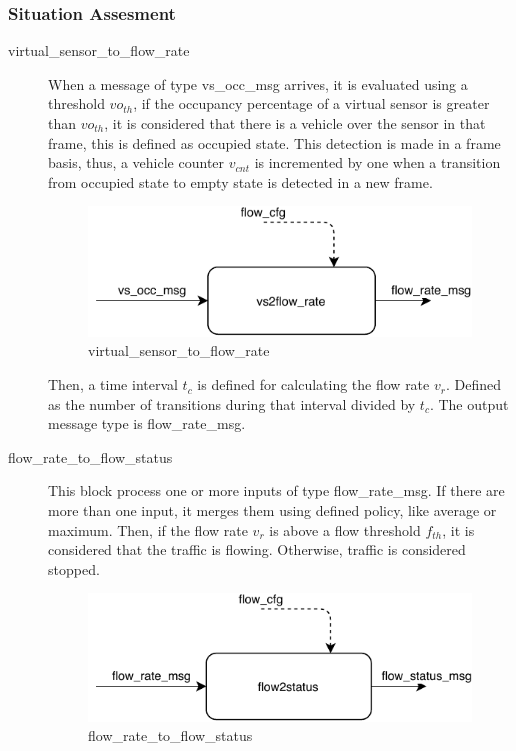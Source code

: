 \subsubsection{Situation Assesment}
\begin{description}

\item[virtual\_sensor\_to\_flow\_rate] \hfill

When a message of type vs\_occ\_msg arrives, it is evaluated using a threshold $vo_{th}$, if the occupancy percentage of a virtual sensor is greater than $vo_{th}$, it is considered that there is a vehicle over the sensor in that frame, this is defined as occupied state. This detection is made in a frame basis, thus, a vehicle counter $v_{cnt}$ is incremented by one when a transition from occupied state to empty state is detected in a new frame.

\begin{figure}[ht!]
\centering
\includegraphics[scale=1]{fig/3/vs2flow.pdf}
\caption{virtual\_sensor\_to\_flow\_rate}
\label{virtual_sensor_to_flow_status}
\end{figure}



Then, a time interval $t_{c}$ is defined for calculating the flow rate $v_{r}$. Defined as the number of transitions during that interval divided by $t_{c}$. The output message type is flow\_rate\_msg.

\hfill

\item[flow\_rate\_to\_flow\_status] \hfill

This block process one or more inputs of type flow\_rate\_msg. If there are more than one input, it merges them using defined policy, like average or maximum. Then, if the flow rate $v_{r}$ is above a flow threshold $f_{th}$, it is considered that the traffic is flowing. Otherwise, traffic is considered stopped.

\begin{figure}[ht!]
\centering
\includegraphics[scale=1]{fig/3/flow2status.pdf}
\caption{flow\_rate\_to\_flow\_status}
\label{flow_rate_to_flow_status}
\end{figure}




\end{description}
